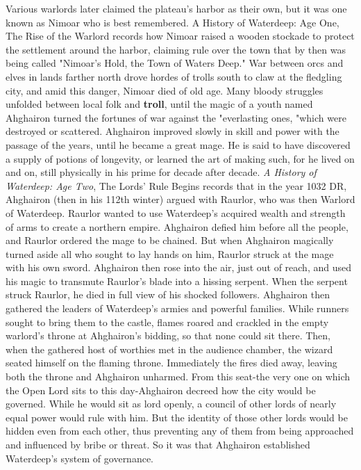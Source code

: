 \documentclass[10pt,a4paper,twoside,twocolumn,openany,nodeprecatedcode]{dndbook}
\begin{document}
Various warlords later claimed the plateau's harbor as their own, but it was one known as Nimoar who is best remembered. A History of Waterdeep: Age One, The Rise of the Warlord records how Nimoar raised a wooden stockade to protect the settlement around the harbor, claiming rule over the town that by then was being called "Nimoar's Hold, the Town of Waters Deep." War between orcs and elves in lands farther north drove hordes of trolls south to claw at the fledgling city, and amid this danger, Nimoar died of old age. Many bloody struggles unfolded between local folk and \textbf{troll}, until the magic of a youth named Ahghairon turned the fortunes of war against the "everlasting ones, "which were destroyed or scattered. Ahghairon improved slowly in skill and power with the passage of the years, until he became a great mage. He is said to have discovered a supply of potions of longevity, or learned the art of making such, for he lived on and on, still physically in his prime for decade after decade. \textit{A History of Waterdeep: Age Two}, The Lords' Rule Begins records that in the year 1032 DR, Ahghairon (then in his 112th winter) argued with Raurlor, who was then Warlord of Waterdeep. Raurlor wanted to use Waterdeep's acquired wealth and strength of arms to create a northern empire. Ahghairon defied him before all the people, and Raurlor ordered the mage to be chained. But when Ahghairon magically turned aside all who sought to lay hands on him, Raurlor struck at the mage with his own sword. Ahghairon then rose into the air, just out of reach, and used his magic to transmute Raurlor's blade into a hissing serpent. When the serpent struck Raurlor, he died in full view of his shocked followers.
Ahghairon then gathered the leaders of Waterdeep's armies and powerful families. While runners sought to bring them to the castle, flames roared and crackled in the empty warlord's throne at Ahghairon's bidding, so that none could sit there. Then, when the gathered host of worthies met in the audience chamber, the wizard seated himself on the flaming throne. Immediately the fires died away, leaving both the throne and Ahghairon unharmed.
From this seat-the very one on which the Open Lord sits to this day-Ahghairon decreed how the city would be governed. While he would sit as lord openly, a council of other lords of nearly equal power would rule with him. But the identity of those other lords would be hidden even from each other, thus preventing any of them from being approached and influenced by bribe or threat. So it was that Ahghairon established Waterdeep's system of governance.
\end{document}
